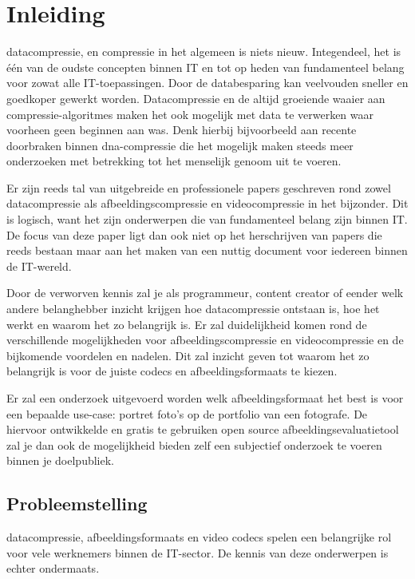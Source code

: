 
\chapter{Inleiding}
\label{ch:inleiding}

\Gls{datacompressie}, en compressie in het algemeen is niets nieuw. Integendeel, het is één van de oudste concepten binnen IT en tot op heden van fundamenteel belang voor zowat alle IT-toepassingen. Door de databesparing kan veelvouden sneller en goedkoper gewerkt worden. Datacompressie en de altijd groeiende waaier aan \glspl{compressie-algoritme} maken het ook mogelijk met data te verwerken waar voorheen geen beginnen aan was. Denk hierbij bijvoorbeeld aan recente doorbraken binnen \gls{dna-compressie} die het mogelijk maken steeds meer onderzoeken met betrekking tot het menselijk genoom uit te voeren.

Er zijn reeds tal van uitgebreide en professionele papers geschreven rond zowel \gls{datacompressie} als \gls{afbeeldingscompressie} en \gls{videocompressie} in het bijzonder. Dit is logisch, want het zijn onderwerpen die van fundamenteel belang zijn binnen IT. De focus van deze paper ligt dan ook niet op het herschrijven van papers die reeds bestaan maar aan het maken van een nuttig document voor iedereen binnen de IT-wereld. 

Door de verworven kennis zal je als programmeur, content creator of eender welk andere belanghebber inzicht krijgen hoe \gls{datacompressie} ontstaan is, hoe het werkt en waarom het zo belangrijk is. Er zal duidelijkheid komen rond de verschillende mogelijkheden voor \gls{afbeeldingscompressie} en \gls{videocompressie} en de bijkomende voordelen en nadelen. Dit zal inzicht geven tot waarom het zo belangrijk is voor de juiste \glspl{codec} en \glspl{afbeeldingsformaat} te kiezen.

Er zal een onderzoek uitgevoerd worden welk \gls{afbeeldingsformaat} het best is voor een bepaalde \gls{use-case}: portret foto's op de portfolio van een fotografe. De hiervoor ontwikkelde en gratis te gebruiken open source  \gls{afbeeldingsevaluatietool} zal je dan ook de mogelijkheid bieden zelf een subjectief onderzoek te voeren binnen je doelpubliek.

\section{Probleemstelling}
\label{sec:probleemstelling}
\Gls{datacompressie}, \glspl{afbeeldingsformaat} en video \glspl{codec} spelen een belangrijke rol voor vele werknemers binnen de IT-sector. De kennis van deze onderwerpen is echter ondermaats. 

